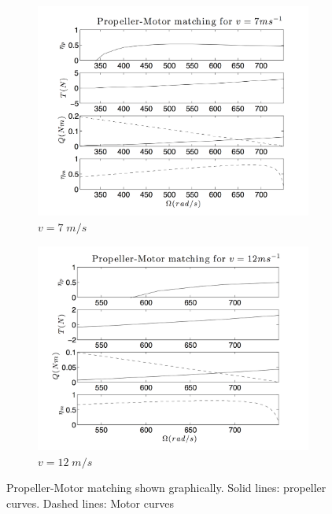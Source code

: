 \documentclass[11pt]{article}
\begin{document}
\begin{figure}[h!]
  \centering
    \begin{subfigure}[b]{0.49\textwidth}
                \includegraphics[width=\textwidth]{Figures/PS3/propmotor_v07p0.png}
                \caption{$v = 7 \; m/s$}
        \end{subfigure}
        \begin{subfigure}[b]{0.49\textwidth}
                \includegraphics[width=\textwidth]{Figures/PS3/propmotor_v12p0.png}
                \caption{$v = 12 \; m/s$}
        \end{subfigure}%
  \caption{Propeller-Motor matching shown graphically. Solid lines: propeller curves. Dashed lines: Motor curves}\label{fig:prop-motor1}
\end{figure}
\end{document}

